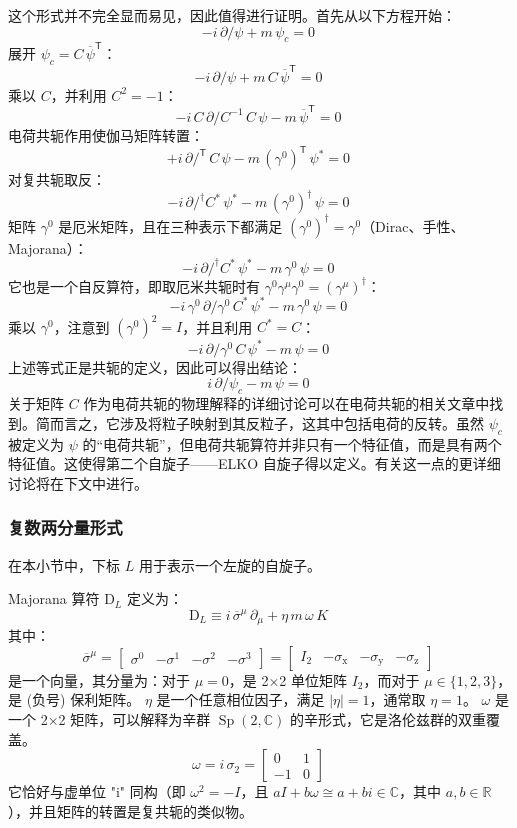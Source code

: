 这个形式并不完全显而易见，因此值得进行证明。首先从以下方程开始：
\[
-i\,{\partial \!\!\!{\big /}}\psi + m\,\psi_c = 0~
\]
展开 \(\psi_c = C\,{\overline{\psi}}^{\mathsf{T}}\)：
\[
-i\,{\partial \!\!\!{\big /}}\psi + m\,C\,{\overline{\psi}}^{\mathsf{T}} = 0~
\]
乘以 \(C\)，并利用 \(C^2 = -1\)：
\[
-i\,C\,{\partial \!\!\!{\big /}}C^{-1}\,C\,\psi - m\,{\overline{\psi}}^{\mathsf{T}} = 0~
\]
电荷共轭作用使伽马矩阵转置：
\[
+i\,{\partial \!\!\!{\big /}}^{\mathsf{T}}\,C\,\psi - m\,\left(\gamma^0\right)^{\mathsf{T}}\,\psi^* = 0~
\]
对复共轭取反：
\[
-i\,{\partial \!\!\!{\big /}}^{\dagger} C^{*}\,\psi^* - m\,\left(\gamma^0\right)^{\dagger}\,\psi = 0~
\]
矩阵 \(\gamma^0\) 是厄米矩阵，且在三种表示下都满足 \(\left(\gamma^0\right)^{\dagger} = \gamma^0\)（Dirac、手性、Majorana）：
\[
-i\,{\partial \!\!\!{\big /}}^{\dagger} C^{*}\,\psi^* - m\,\gamma^0\,\psi = 0~
\]
它也是一个自反算符，即取厄米共轭时有 \(\gamma^0 \gamma^\mu \gamma^0 = (\gamma^\mu)^{\dagger}\)：
\[
-i\,\gamma^0\,{\partial \!\!\!{\big /}} \gamma^0\,C^{*}\,\psi^* - m\,\gamma^0\,\psi = 0~
\]
乘以 \(\gamma^0\)，注意到 \(\left(\gamma^0\right)^2 = I\)，并且利用 \(C^{*} = C\)：
\[
-i\,{\partial \!\!\!{\big /}}\gamma^0\,C\,\psi^* - m\,\psi = 0~
\]
上述等式正是共轭的定义，因此可以得出结论：
\[
i\,{\partial \!\!\!{\big /}}\psi_c - m\,\psi = 0~
\]
关于矩阵 \(C\) 作为电荷共轭的物理解释的详细讨论可以在电荷共轭的相关文章中找到。简而言之，它涉及将粒子映射到其反粒子，这其中包括电荷的反转。虽然 \(\psi_c\) 被定义为 \(\psi\) 的“电荷共轭”，但电荷共轭算符并非只有一个特征值，而是具有两个特征值。这使得第二个自旋子——ELKO 自旋子得以定义。有关这一点的更详细讨论将在下文中进行。
\subsubsection{复数两分量形式}  
在本小节中，下标 \(L\) 用于表示一个左旋的自旋子。  

Majorana 算符 \( \mathrm{D}_{L} \) 定义为：
\[
\mathrm{D}_{L} \equiv i \, \overline{\sigma}^{\mu} \, \partial_{\mu} + \eta \, m \, \omega \, K~
\]
其中：
\[
\overline{\sigma}^{\mu} = \begin{bmatrix} \sigma^{0} & -\sigma^{1} & -\sigma^{2} & -\sigma^{3} \end{bmatrix} = \begin{bmatrix} I_{2} & -\sigma_{\text{x}} & -\sigma_{\text{y}} & -\sigma_{\text{z}} \end{bmatrix}~
\]
是一个向量，其分量为：对于 \(\mu = 0\)，是 2×2 单位矩阵 \(I_2\)，而对于 \(\mu \in \{1, 2, 3\}\)，是 (负号) 保利矩阵。  
\(\eta\) 是一个任意相位因子，满足 \(|\eta| = 1\)，通常取 \(\eta = 1\)。  
\(\omega\) 是一个 2×2 矩阵，可以解释为辛群 \( \operatorname{Sp}(2, \mathbb{C}) \) 的辛形式，它是洛伦兹群的双重覆盖。  
\[
\omega = i \, \sigma_2 = \begin{bmatrix} 0 & 1 \\ -1 & 0 \end{bmatrix}~
\]
它恰好与虚单位 "i" 同构（即 \(\omega^2 = -I\)，且 \(a I + b \omega \cong a + b i \in \mathbb{C}\)，其中 \(a, b \in \mathbb{R}\)），并且矩阵的转置是复共轭的类似物。  

